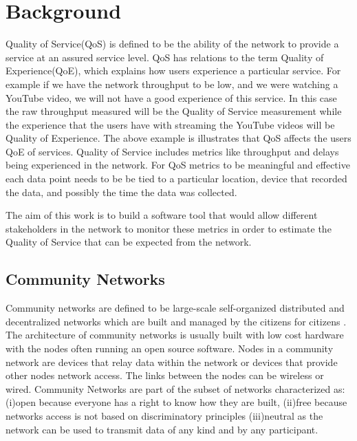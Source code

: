 \section{Background}\label{sec:background}
Quality of Service(QoS) is defined to be the ability of the network to provide a service at an assured service level\cite{soldani_book}.
QoS has relations to the term Quality of Experience(QoE), which explains how users experience a particular service\cite{6462223}.
For example if we have the network throughput to be low, and we were watching a YouTube video, we will not have a good experience of this service.
In this case the raw throughput measured will be the Quality of Service measurement while the experience that the users have with streaming the YouTube videos will be Quality of Experience.
The above example is illustrates that QoS affects the users QoE of services.
Quality of Service includes metrics like throughput and delays being experienced in the network.
For QoS metrics to be meaningful and effective each data point needs to be be tied to a particular location, device that recorded the data, and possibly the time the data was collected.

The aim of this work is to build a software tool that would allow different stakeholders in the network to monitor these metrics in order to estimate the Quality of Service that can be expected from the network.
\subsection{Community Networks}\label{subsec:community-networks}
Community networks are defined to be large-scale self-organized distributed and decentralized networks which are built and managed by the citizens for citizens \cite{Braem:2013:CRC:2500098.2500108}.
The architecture of community networks is usually built with low cost hardware with the nodes often running an open source software\cite{Braem:2013:CRC:2500098.2500108}.
Nodes in a community network are devices that relay data within the network or devices that provide other nodes network access\cite{8320771}.
The links between the nodes can be wireless or wired\cite{8320771}.
Community Networks are part of the subset of networks characterized as:
(i)open because everyone has a right to know how they are built,
(ii)free because networks access is not based on discriminatory principles
(iii)neutral as the network can be used to transmit data of any kind and by any participant\cite{Braem:2015:AEQ:2830629.2830639}.

